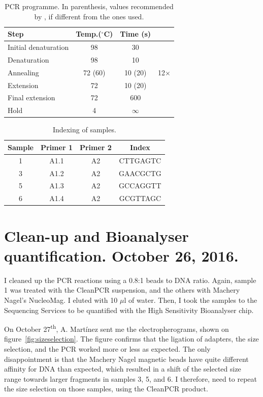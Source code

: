 \documentclass[a4paper,12pt]{article}
\begin{document}
\begin{table}
 \begin{center}
  \caption{PCR programme. In parenthesis, values recommended by \citet{Meyer2010}, if different from the ones used.}\label{tau:pcrprogramme}
  \vspace*{0.3cm}
  \begin{tabular}{lccl}
   \toprule
Step&Temp.($^\circ$C)&Time (s)&\\
   \midrule
Initial denaturation&98&30&\\
Denaturation&98&\multicolumn{1}{c|}{10}&\\
Annealing&72 (60)&\multicolumn{1}{c|}{10 (20)}&12$\times$\\
Extension&72&\multicolumn{1}{c|}{10 (20)}&\\
Final extension&72&600&\\
Hold&4&$\infty$&\\
   \bottomrule
  \end{tabular}
 \end{center}
\end{table}

\begin{table}
 \begin{center}
  \caption{Indexing of samples.}\label{tau:index}
  \begin{tabular}{cccc}
   \toprule
Sample&Primer 1&Primer 2&Index\\
   \midrule
1&A1.1&A2&CTTGAGTC\\
3&A1.2&A2&GAACGCTG\\
5&A1.3&A2&GCCAGGTT\\
6&A1.4&A2&GCGTTAGC\\
   \bottomrule
  \end{tabular}
 \end{center}
\end{table}

\section{Clean-up and Bioanalyser quantification. October 26, 2016.}
I cleaned up the PCR reactions using a 0.8:1 beads to DNA ratio. Again, sample 1 was treated with the CleanPCR suspension, and the others with Machery Nagel's NucleoMag. I eluted with 10 $\mu$l of water. Then, I took the samples to the Sequencing Services to be quantified with the High Sensitivity Bioanalyser chip.

On October 27\textsuperscript{th}, A. Martínez sent me the electropherograms, shown on figure~\ref{fig:sizeselection}. The figure confirms that the ligation of adapters, the size selection, and the PCR worked more or less as expected. The only disappointment is that the Machery Nagel magnetic beads have quite different affinity for DNA than expected, which resulted in a shift of the selected size range towards larger fragments in samples 3, 5, and 6. I therefore, need to repeat the size selection on those samples, using the CleanPCR product.
\end{document}

